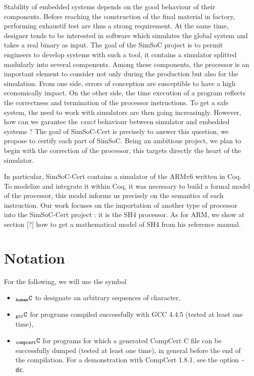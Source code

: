 \documentclass[a4paper, 11pt]{article}
\newcommand{\C}{$_{\tt compcert}{\tt C}$\xspace}
\newcommand{\gccC}{$_{\tt gcc}{\tt C}$\xspace}
\newcommand{\hC}{$_{\tt human}{\tt C}$\xspace}
\begin{document}
Stability of embedded systems depends on the good behaviour of their components. Before reaching the construction of the final material in factory, performing exhaustif test are thus a strong requirement. At the same time, designer tends to be interested in software which simulates the global system and takes a real binary as input. The goal of the SimSoC project is to permit engineers to develop systems with such a tool, it contains a simulator splitted modularly into several components. Among these components, the processor is an important element to consider not only during the production but also for the simulation. From one side, errors of conception are susceptible to have a high economically impact. On the other side, the time execution of a program reflects the correctness and termination of the processor instructions. To get a safe system, the need to work with simulators are then going increasingly. However, how can we garantee the \emph{exact} behaviour between simulator and embedded systems ? 
The goal of SimSoC-Cert is precisely to answer this question, we propose to certify each part of SimSoC. Being an ambitious project, we plan to begin with the correction of the processor, this targets directly the heart of the simulator.

In particular, SimSoC-Cert contains a simulator of the ARMv6 written in Coq. To modelize and integrate it within Coq, it was necessary to build a formal model of the processor, this model informs us precisely on the semantics of each instruction.
Our work focuses on the importation of another type of processor into the SimSoC-Cert project : it is the SH4 processor. As for ARM, we show at section [?] how to get a mathematical model of SH4 from his reference manual.


\section*{Notation}
For the following, we will use the symbol 
\begin{itemize}
\item \hC to designate an arbitrary sequences of character, 
\item \gccC for programs compiled successfully with GCC 4.4.5 (tested at least one time),
\item \C for programs for which a generated CompCert C file can be successfully dumped (tested at least one time), in general before the end of the compilation. For a demonstration with CompCert 1.8.1, see the option \verb|-dc|.
\end{itemize}
\end{document}
